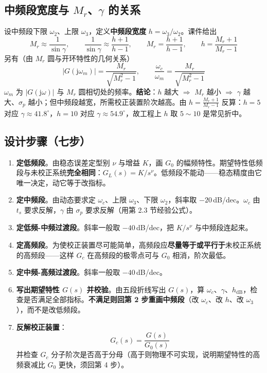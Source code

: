 \subsection{中频段宽度与 $M_r$、$\gamma$ 的关系}
设中频段下限 $\omega_2$、上限 $\omega_3$，定义\textbf{中频段宽度} $h=\omega_3/\omega_2$。课件给出
\[
M_r\approx\frac{1}{\sin\gamma},\qquad
\frac{1}{\sin\gamma}\approx\frac{h+1}{h-1},\qquad
M_r=\frac{h+1}{h-1},\qquad
h=\frac{M_r+1}{M_r-1}
\]
另有（由 $M_r$ 圆与开环特性的几何关系）
\[
\bigl|G(\mathrm{j}\omega_m)\bigr|=\frac{M_r}{\sqrt{M_r^{2}-1}},\qquad
\frac{\omega_c}{\omega_m}=\frac{M_r}{\sqrt{M_r^{2}-1}}
\]
$\omega_m$ 为 $|G(\mathrm{j}\omega)|$ 与 $M_r$ 圆相切处的频率。\textbf{结论}：$h$ 越大 $\Rightarrow$ $M_r$ 越小 $\Rightarrow$ $\gamma$ 越大、$\sigma_p$ 越小；但中频段越宽，所需校正装置阶次越高。由 $h=\frac{M_r+1}{M_r-1}$ 反算：$h=5$ 对应 $\gamma\approx41.8^\circ$，$h=10$ 对应 $\gamma\approx54.9^\circ$，故工程上 $h$ 取 $5\sim10$ 是常见折中。

\subsection{设计步骤（七步）}
\begin{enumerate}
    \item \textbf{定低频段}。由稳态误差定型别 $\nu$ 与增益 $K$，画 $G_0$ 的幅频特性。期望特性低频段与未校正系统\textbf{完全相同}：$G_L(s)=K/s^{\nu}$。低频段不能动——稳态精度由它唯一决定，动它等于改指标。
    \item \textbf{定中频段}。由动态要求定 $\omega_c$、上限 $\omega_3$、下限 $\omega_2$，斜率取 $-20$\,dB/dec。$\omega_c$ 由 $t_s$ 要求反解，$\gamma$ 由 $\sigma_p$ 要求反解（用第 2.3 节经验公式）。
    \item \textbf{定低频-中频过渡段}。斜率一般取 $-40$\,dB/dec，把 $K/s^\nu$ 与中频段连起来。
    \item \textbf{定高频段}。为使校正装置尽可能简单，高频段应\textbf{尽量等于或平行于}未校正系统的高频段——这样 $G_c$ 在高频段的极零点可与 $G_0$ 相消，阶次最低。
    \item \textbf{定中频-高频过渡段}。斜率一般取 $-40$\,dB/dec。
    \item \textbf{写出期望特性 $G(s)$ 并校验}。由五段折线写出 $G(s)$，算 $\omega_c$、$\gamma$、$h_{\mathrm{dB}}$，检查是否满足全部指标。\textbf{不满足则回第 2 步重画中频段}（改 $\omega_c$、改 $h$、改 $\omega_3$），而不是改低频段。
    \item \textbf{反解校正装置}：
    \[
    \boxed{\ G_c(s)=\frac{G(s)}{G_0(s)}\ }
    \]
    并检查 $G_c$ 分子阶次是否高于分母（高于则物理不可实现，说明期望特性的高频衰减比 $G_0$ 更快，须回第 4 步）。
\end{enumerate}

